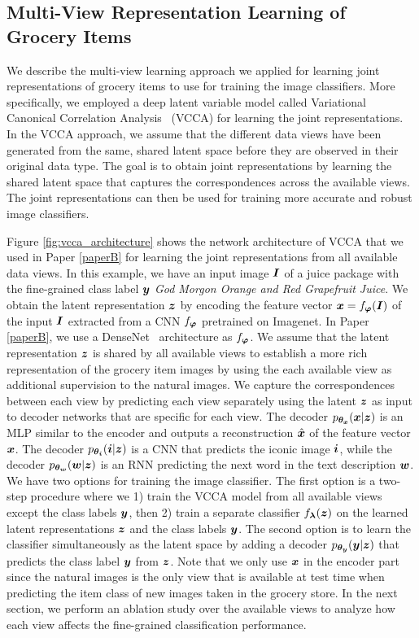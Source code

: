 \subsection{Multi-View Representation Learning of Grocery Items}

We describe the multi-view learning approach we applied for learning joint representations of grocery items to use for training the image classifiers. More specifically, we employed a deep latent variable model called Variational Canonical Correlation Analysis~\cite{wang2016deep} (VCCA) for learning the joint representations. In the VCCA approach, we assume that the different data views have been generated from the same, shared latent space before they are observed in their original data type. The goal is to obtain joint representations by learning the shared latent space that captures the correspondences across the available views. The joint representations can then be used for training more accurate and robust image classifiers.

Figure \ref{fig:vcca_architecture} shows the network architecture of VCCA that we used in Paper \ref{paperB} for learning the joint representations from all available data views. In this example, we have an input image ${\bm{I}}$ of a juice package with the fine-grained class label ${\bm{y}}$ \textit{God Morgon Orange and Red Grapefruit Juice}. We obtain the latent representation ${\bm{z}}$ by encoding the feature vector ${\bm{x}} = f_{{\bm{\varphi}}}({\bm{I}})$ of the input ${\bm{I}}$ extracted from a CNN $f_{{\bm{\varphi}}}$ pretrained on Imagenet. In Paper \ref{paperB}, we use a DenseNet~\cite{huang2017densely} architecture as $f_{{\bm{\varphi}}}$. 
We assume that the latent representation ${\bm{z}}$ is shared by all available views to establish a more rich representation of the grocery item images by using the each available view as additional supervision to the natural images. 
We capture the correspondences between each view by predicting each view separately using the latent ${\bm{z}}$ as input to decoder networks that are specific for each view. 
The decoder $p_{{\bm{\theta}}_{{\bm{x}}}}({\bm{x}} | {\bm{z}})$ is an MLP similar to the encoder and outputs a reconstruction $\hat{{\bm{x}}}$ of the feature vector ${\bm{x}}$. The decoder $p_{{\bm{\theta}}_{{\bm{i}}}}({\bm{i}} | {\bm{z}})$ is a CNN that predicts the iconic image ${\bm{i}}$, while the decoder $p_{{\bm{\theta}}_{{\bm{w}}}}({\bm{w}} | {\bm{z}})$ is an RNN predicting the next word in the text description ${\bm{w}}$. 
We have two options for training the image classifier. The first option is a two-step procedure where we 1) train the VCCA model from all available views except the class labels ${\bm{y}}$, then 2) train a separate classifier $f_{{\bm{\lambda}}}({\bm{z}})$ on the learned latent representations ${\bm{z}}$ and the class labels ${\bm{y}}$. The second option is to learn the classifier simultaneously as the latent space by adding a decoder $p_{{\bm{\theta}}_{{\bm{y}}}}({\bm{y}} | {\bm{z}})$ that predicts the class label ${\bm{y}}$ from ${\bm{z}}$.
Note that we only use ${\bm{x}}$ in the encoder part since the natural images is the only view that is available at test time when predicting the item class of new images taken in the grocery store. In the next section, we perform an ablation study over the available views to analyze how each view affects the fine-grained classification performance.  

